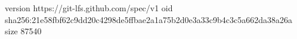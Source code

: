 version https://git-lfs.github.com/spec/v1
oid sha256:21e58fbf62c9dd20c4298de5ffbae2a1a75b2d0e3a33c9b4c3c5a662da38a26a
size 87540
